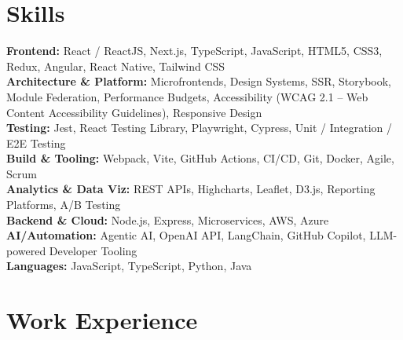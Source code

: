 \documentclass[a4paper,10pt]{article}
\begin{document}
\section*{Skills}
\textbf{Frontend:} React / ReactJS, Next.js, TypeScript, JavaScript, HTML5, CSS3, Redux, Angular, React Native, Tailwind CSS \\
\textbf{Architecture \& Platform:} Microfrontends, Design Systems, SSR, Storybook, Module Federation, Performance Budgets, Accessibility (WCAG 2.1 -- Web Content Accessibility Guidelines), Responsive Design \\
\textbf{Testing:} Jest, React Testing Library, Playwright, Cypress, Unit / Integration / E2E Testing \\
\textbf{Build \& Tooling:} Webpack, Vite, GitHub Actions, CI/CD, Git, Docker, Agile, Scrum \\
\textbf{Analytics \& Data Viz:} REST APIs, Highcharts, Leaflet, D3.js, Reporting Platforms, A/B Testing \\
\textbf{Backend \& Cloud:} Node.js, Express, Microservices, AWS, Azure \\
\textbf{AI/Automation:} Agentic AI, OpenAI API, LangChain, GitHub Copilot, LLM-powered Developer Tooling \\
\textbf{Languages:} JavaScript, TypeScript, Python, Java

\section*{Work Experience}
\end{document}
